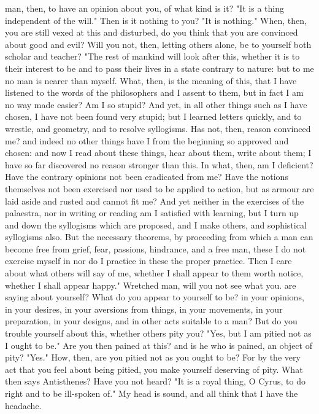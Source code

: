 \documentclass[a4paper]{article}
\begin{document}
man, then, to have an opinion about you, of what kind is it? "It is a thing
independent of the will." Then is it nothing to you? "It is nothing." When,
then, you are still vexed at this and disturbed, do you think that you are
convinced about good and evil?
    Will you not, then, letting others alone, be to yourself both scholar and
teacher? "The rest of mankind will look after this, whether it is to their
interest to be and to pass their lives in a state contrary to nature: but to me
no man is nearer than myself. What, then, is the meaning of this, that I have
listened to the words of the philosophers and I assent to them, but in fact I
am no way made easier? Am I so stupid? And yet, in all other things such as I
have chosen, I have not been found very stupid; but I learned letters quickly,
and to wrestle, and geometry, and to resolve syllogisms. Has not, then, reason
convinced me? and indeed no other things have I from the beginning so approved
and chosen: and now I read about these things, hear about them, write about
them; I have so far discovered no reason stronger than this. In what, then, am
I deficient? Have the contrary opinions not been eradicated from me? Have the
notions themselves not been exercised nor used to be applied to action, but as
armour are laid aside and rusted and cannot fit me? And yet neither in the
exercises of the palaestra, nor in writing or reading am I satisfied with
learning, but I turn up and down the syllogisms which are proposed, and I make
others, and sophistical syllogisms also. But the necessary theorems, by
proceeding from which a man can become free from grief, fear, passions,
hindrance, and a free man, these I do not exercise myself in nor do I practice
in these the proper practice. Then I care about what others will say of me,
whether I shall appear to them worth notice, whether I shall appear happy."
    Wretched man, will you not see what you. are saying about yourself? What do
you appear to yourself to be? in your opinions, in your desires, in your
aversions from things, in your movements, in your preparation, in your designs,
and in other acts suitable to a man? But do you trouble yourself about this,
whether others pity you? "Yes, but I am pitied not as I ought to be." Are you
then pained at this? and is he who is pained, an object of pity? "Yes." How,
then, are you pitied not as you ought to be? For by the very act that you feel
about being pitied, you make yourself deserving of pity. What then says
Antisthenes? Have you not heard? "It is a royal thing, O Cyrus, to do right and
to be ill-spoken of." My head is sound, and all think that I have the headache.
\end{document}
